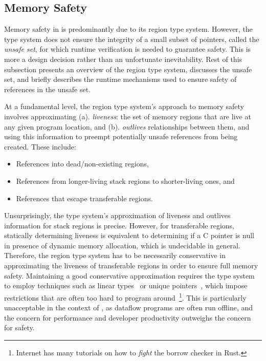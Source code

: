 \subsection{Memory Safety}
\label{sec:memory-safety}

Memory safety in \name is predominantly due to its region type system.
However, the type system does not ensure the integrity of a small
subset of pointers, called the \emph{unsafe set}, for which runtime
verification is needed to guarantee safety. This is more a design
decision rather than an unfortunate inevitability. Rest of this
subsection presents an overview of the region type system, discusses
the unsafe set, and briefly describes the runtime mechanisms used to
ensure safety of references in the unsafe set. 

At a fundamental level, the region type system's approach to memory
safety involves approximating (a). \emph{liveness}: the set of memory
regions that are live at any given program location, and (b).
\emph{outlives} relationships between them, and using this information
to preempt potentially unsafe references from being created. These
include:
\begin{itemize}
\item References into dead/non-existing regions,
\item References from longer-living stack regions to shorter-living ones, and 
\item References that escape transferable regions.
\end{itemize}
Unsurprisingly, the type system's approximation of liveness and
outlives information for stack regions is precise. However, for
transferable regions, statically determining liveness is equivalent to
determining if a C pointer is null in presence of dynamic memory
allocation, which is undecidable in general. Therefore, the region
type system has to be necessarily conservative in approximating the
liveness of transferable regions in order to ensure full memory
safety. Maintaining a good conservative approximation requires the
type system to employ techniques such as linear types~\cite{wadlerlt}
or unique pointers~\cite{rust}, which impose restrictions that are
often too hard to program around~\footnote{Internet has many tutorials
on how to \emph{fight} the borrow checker in Rust.}. This is
particularly unacceptable in the context of \name, as dataflow
programs are often run offline, and the concern for performance and
developer productivity outweighs the concern for safety. 

